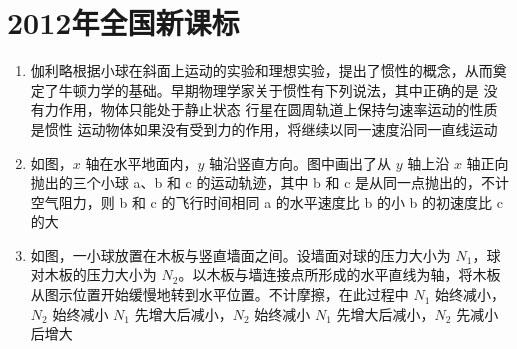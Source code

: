 \documentclass[\gkver]{gaokaozhenti}
\begin{document}
\chapter{2012年全国新课标}

\begin{enumerate}
\item
伽利略根据小球在斜面上运动的实验和理想实验，提出了惯性的概念，从而奠定了牛顿力学的基础。早期物理学家关于惯性有下列说法，其中正确的是
{没有力作用，物体只能处于静止状态}
{行星在圆周轨道上保持匀速率运动的性质是惯性}
{运动物体如果没有受到力的作用，将继续以同一速度沿同一直线运动}

\item
如图，$x$ 轴在水平地面内，$y$ 轴沿竖直方向。图中画出了从 $y$ 轴上沿 $x$ 轴正向抛出的三个小球 a、b 和 c 的运动轨迹，其中 b 和 c 是从同一点抛出的，不计空气阻力，则
{b 和 c 的飞行时间相同}
{a 的水平速度比 b 的小}
{b 的初速度比 c 的大}

\item
如图，一小球放置在木板与竖直墙面之间。设墙面对球的压力大小为 $N_{1}$，球对木板的压力大小为 $N_{2}$。以木板与墙连接点所形成的水平直线为轴，将木板从图示位置开始缓慢地转到水平位置。不计摩擦，在此过程中
{$N_{1}$ 始终减小，$N_{2}$ 始终减小}
{$N_{1}$ 先增大后减小，$N_{2}$ 始终减小}
{$N_{1}$ 先增大后减小，$N_{2}$ 先减小后增大}
\end{enumerate}
\end{document}
